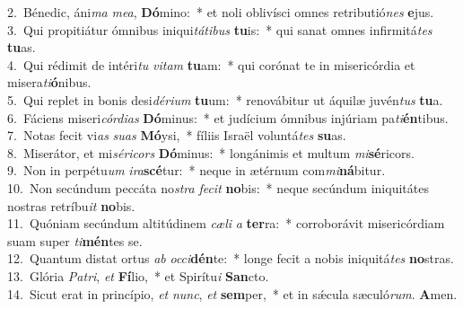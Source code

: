 {2.~}Bénedic, áni\textit{ma} \textit{me}\textit{a}, \textbf{Dó}mino:~* et noli oblivísci omnes retributió\textit{nes} \textbf{e}jus.\\
{3.~}Qui propitiátur ómnibus iniqui\textit{tá}\textit{ti}\textit{bus} \textbf{tu}is:~* qui sanat omnes infirmitá\textit{tes} \textbf{tu}as.\\
{4.~}Qui rédimit de intéri\textit{tu} \textit{vi}\textit{tam} \textbf{tu}am:~* qui corónat te in misericórdia et misera\textit{ti}\textbf{ó}nibus.\\
{5.~}Qui replet in bonis desi\textit{dé}\textit{ri}\textit{um} \textbf{tu}um:~* renovábitur ut áquilæ juvén\textit{tus} \textbf{tu}a.\\
{6.~}Fáciens miseri\textit{cór}\textit{di}\textit{as} \textbf{Dó}minus:~* et judícium ómnibus injúriam pa\textit{ti}\textbf{én}tibus.\\
{7.~}Notas fecit vi\textit{as} \textit{su}\textit{as} \textbf{Mó}ysi,~* fíliis Israël voluntá\textit{tes} \textbf{su}as.\\
{8.~}Miserátor, et mi\textit{sé}\textit{ri}\textit{cors} \textbf{Dó}minus:~* longánimis et multum \textit{mi}\textbf{sé}ricors.\\
{9.~}Non in perpétu\textit{um} \textit{i}\textit{ra}\textbf{scé}tur:~* neque in ætérnum com\textit{mi}\textbf{ná}bitur.\\
{10.~}Non secúndum peccáta no\textit{stra} \textit{fe}\textit{cit} \textbf{no}bis:~* neque secúndum iniquitátes nostras retríbu\textit{it} \textbf{no}bis.\\
{11.~}Quóniam secúndum altitúdinem \textit{cæ}\textit{li} \textit{a} \textbf{ter}ra:~* corroborávit misericórdiam suam super \textit{ti}\textbf{mén}tes se.\\
{12.~}Quantum distat ortus \textit{ab} \textit{oc}\textit{ci}\textbf{dén}te:~* longe fecit a nobis iniquitá\textit{tes} \textbf{no}stras.\\
{13.~}Glória \textit{Pa}\textit{tri}, \textit{et} \textbf{Fí}lio,~* et Spirítu\textit{i} \textbf{San}cto.\\
{14.~}Sicut erat in princípio, \textit{et} \textit{nunc}, \textit{et} \textbf{sem}per,~* et in sǽcula sæculó\textit{rum}. \textbf{A}men.\\
